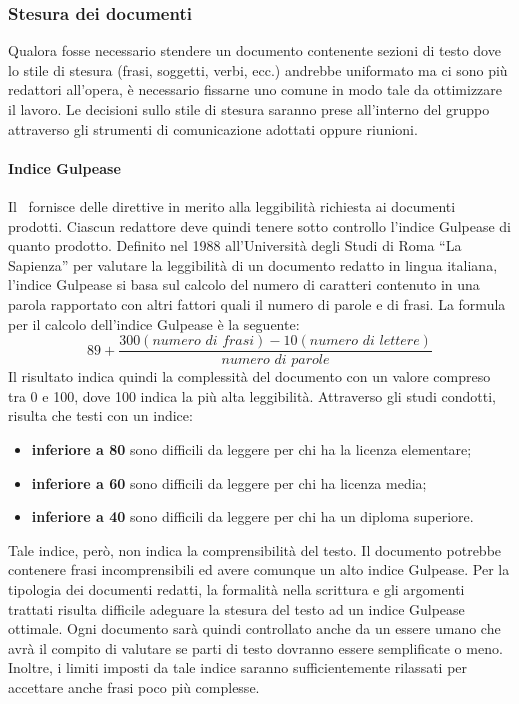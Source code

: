 \documentclass[../NormeDiProgetto.tex]{subfiles}
\begin{document}
			\subsubsection{Stesura dei documenti}
					Qualora fosse necessario stendere un documento contenente sezioni di testo dove lo stile
					di stesura (frasi, soggetti, verbi, ecc.) andrebbe uniformato ma ci sono più redattori
					all'opera, è necessario fissarne uno comune in modo tale da ottimizzare il lavoro.
					Le decisioni sullo stile di stesura saranno prese all'interno del gruppo attraverso
					gli strumenti di comunicazione adottati oppure riunioni.\\
					\paragraph{Indice Gulpease\\}
						Il \pianodiqualificav\ fornisce delle direttive in merito alla leggibilità richiesta ai documenti prodotti. Ciascun redattore deve quindi tenere sotto controllo l'indice Gulpease di quanto prodotto.
						Definito nel 1988 all'Università degli Studi di Roma ``La
						Sapienza'' per valutare la leggibilità di un documento redatto in
						lingua italiana, l'indice Gulpease si basa sul calcolo del
						numero di caratteri contenuto in una parola rapportato con altri
						fattori quali il numero di parole e di frasi.
						La formula per il calcolo dell'indice Gulpease è la seguente:
						\begin{equation*}
							89+\frac{300\left(\textit{numero di frasi}\right)-10\left(\textit{numero di lettere}\right)}{\textit{numero di parole}}
						\end{equation*}
						Il risultato indica	quindi la complessità del documento con un
						valore compreso tra 0 e 100, dove 100 indica la più alta
						leggibilità. Attraverso gli studi condotti,	risulta che testi con
						un indice:
						\begin{itemize}
							\item \textbf{inferiore a 80} sono difficili da leggere per chi
							ha la licenza elementare;
							\item \textbf{inferiore a 60} sono difficili da leggere per chi
							ha licenza media;
							\item \textbf{inferiore a 40} sono difficili da leggere per chi
							ha un diploma superiore.
						\end{itemize}
						Tale indice, però, non indica la comprensibilità del testo. Il
						documento potrebbe contenere frasi incomprensibili ed avere comunque
						un alto indice Gulpease. Per la tipologia dei documenti redatti, la
						formalità nella scrittura e gli argomenti trattati risulta difficile
						adeguare la stesura del testo ad un indice Gulpease ottimale. Ogni
						documento sarà quindi controllato anche da un essere umano
						che avrà il compito di valutare se parti di testo dovranno essere
						semplificate o meno. Inoltre, i limiti imposti da tale indice
						saranno sufficientemente rilassati per accettare anche frasi poco
						più complesse.
							
\end{document}
